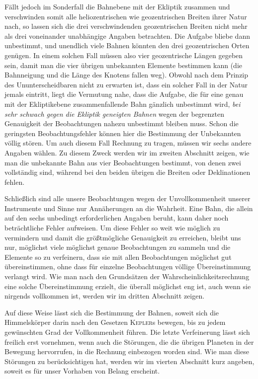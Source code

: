 Fällt jedoch im Sonderfall die Bahnebene mit der Ekliptik zusammen und verschwinden somit alle heliozentrischen wie geozentrischen Breiten ihrer Natur nach, so lassen sich die drei verschwindenden geozentrischen Breiten nicht mehr als drei voneinander unabhängige Angaben betrachten. Die Aufgabe bliebe dann unbestimmt, und unendlich viele Bahnen könnten den drei geozentrischen Orten genügen. In einem solchen Fall müssen also vier geozentrische Längen gegeben sein, damit man die vier übrigen unbekannten Elemente bestimmen kann (die Bahnneigung und die Länge des Knotens fallen weg). Obwohl nach dem Prinzip des Ununterscheidbaren nicht zu erwarten ist, dass ein solcher Fall in der Natur jemals eintritt, liegt die Vermutung nahe, dass die Aufgabe, die für eine genau mit der Ekliptikebene zusammenfallende Bahn gänzlich unbestimmt wird, \emph{bei sehr schwach gegen die Ekliptik geneigten Bahnen} wegen der begrenzten Genauigkeit der Beobachtungen nahezu unbestimmt bleiben muss. Schon die geringsten Beobachtungsfehler können hier die Bestimmung der Unbekannten völlig stören. Um auch diesem Fall Rechnung zu tragen, müssen wir sechs andere Angaben wählen. Zu diesem Zweck werden wir im zweiten Abschnitt zeigen, wie man die unbekannte Bahn aus vier Beobachtungen bestimmt, von denen zwei vollständig sind, während bei den beiden übrigen die Breiten oder Deklinationen fehlen.

Schließlich sind alle unsere Beobachtungen wegen der Unvollkommenheit unserer Instrumente und Sinne nur Annäherungen an die Wahrheit. Eine Bahn, die allein auf den sechs unbedingt erforderlichen Angaben beruht, kann daher noch beträchtliche Fehler aufweisen. Um diese Fehler so weit wie möglich zu vermindern und damit die größtmögliche Genauigkeit zu erreichen, bleibt uns nur, möglichst viele möglichst genaue Beobachtungen zu sammeln und die Elemente so zu verfeinern, dass sie mit allen Beobachtungen möglichst gut übereinstimmen, ohne dass für einzelne Beobachtungen völlige Übereinstimmung verlangt wird. Wie man nach den Grundsätzen der Wahrscheinlichkeitsrechnung eine solche Übereinstimmung erzielt, die überall möglichst eng ist, auch wenn sie nirgends vollkommen ist, werden wir im dritten Abschnitt zeigen.

Auf diese Weise lässt sich die Bestimmung der Bahnen, soweit sich die Himmelskörper darin nach den Gesetzen \textsc{Kepler}s bewegen, bis zu jedem gewünschten Grad der Vollkommenheit führen. Die letzte Verfeinerung lässt sich freilich erst vornehmen, wenn auch die Störungen, die die übrigen Planeten in der Bewegung hervorrufen, in die Rechnung einbezogen worden sind. Wie man diese Störungen zu berücksichtigen hat, werden wir im vierten Abschnitt kurz angeben, soweit es für unser Vorhaben von Belang erscheint.
